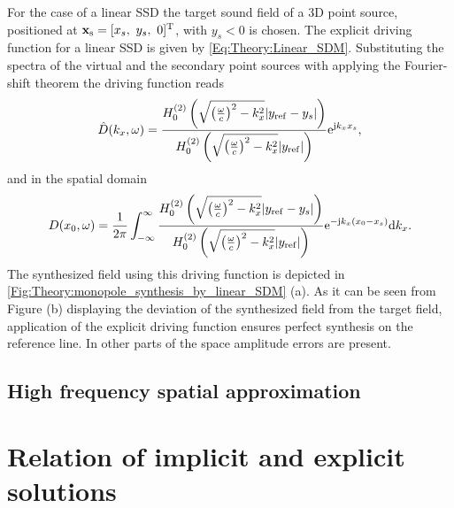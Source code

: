 \vspace{3mm}
For the case of a linear SSD the target sound field of a 3D point source, positioned at $\vxs = [x_s,\ y_s,\ 0]^{\mathrm{T}}$, with $y_s<0$ is chosen. The explicit driving function for a linear SSD is given by \eqref{Eq:Theory:Linear_SDM}. Substituting the spectra of the virtual and the secondary point sources with applying the Fourier-shift theorem the driving function reads
\begin{equation}
\hat{D}(k_x,\omega) = 
\frac{  H_0^{(2)} \left( \sqrt{ \left(\frac{\omega}{c}\right)^2 - k_x^2} |y_{\mathrm{ref}} - y_s| \right)  }
     {  H_0^{(2)} \left( \sqrt{ \left(\frac{\omega}{c}\right)^2 - k_x^2} |y_{\mathrm{ref}}|       \right)  }
\mathrm{e}^{\mathrm{j} k_x x_s},
\end{equation}
and in the spatial domain
\begin{equation}
D(x_0,\omega) = \frac{1}{2\pi} \int_{-\infty}^{\infty} 
\frac{  H_0^{(2)} \left( \sqrt{ \left(\frac{\omega}{c}\right)^2 - k_x^2} |y_{\mathrm{ref}} - y_s| \right)  }
     {  H_0^{(2)} \left( \sqrt{ \left(\frac{\omega}{c}\right)^2 - k_x^2} |y_{\mathrm{ref}}|       \right)  }
\mathrm{e}^{- \mathrm{j} k_x (x_0 - x_s)}
\mathrm{d} k_x.
\end{equation}
The synthesized field using this driving function is depicted in \ref{Fig:Theory:monopole_synthesis_by_linear_SDM} (a). 
As it can be seen from Figure (b) displaying the deviation of the synthesized field from the target field, application of the explicit driving function ensures perfect synthesis on the reference line. In other parts of the space amplitude errors are present.
\newpage  

\subsection{High frequency spatial approximation}

\section{Relation of implicit and explicit solutions}